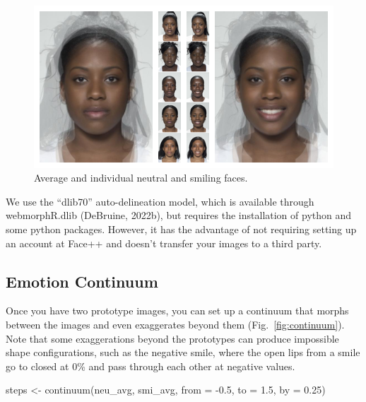 \documentclass[
  man,floatsintext]{apa6}
\newenvironment{Shaded}{\begin{snugshade}}{\end{snugshade}}
\newcommand{\AttributeTok}[1]{\textcolor[rgb]{0.77,0.63,0.00}{#1}}
\newcommand{\FloatTok}[1]{\textcolor[rgb]{0.00,0.00,0.81}{#1}}
\newcommand{\FunctionTok}[1]{\textcolor[rgb]{0.00,0.00,0.00}{#1}}
\newcommand{\NormalTok}[1]{#1}
\newcommand{\OtherTok}[1]{\textcolor[rgb]{0.56,0.35,0.01}{#1}}
\newcommand{\SpecialCharTok}[1]{\textcolor[rgb]{0.00,0.00,0.00}{#1}}
\begin{document}
\begin{figure}
\includegraphics[width=1\linewidth]{index_files/figure-latex/emo-avg-1} \caption{Average and individual neutral and smiling faces.}\label{fig:emo-avg}
\end{figure}

We use the ``dlib70'' auto-delineation model, which is available through webmorphR.dlib (DeBruine, 2022b), but requires the installation of python and some python packages. However, it has the advantage of not requiring setting up an account at Face++ and doesn't transfer your images to a third party.

\hypertarget{emotion-continuum}{%
\subsection{Emotion Continuum}\label{emotion-continuum}}

Once you have two prototype images, you can set up a continuum that morphs between the images and even exaggerates beyond them (Fig.~\ref{fig:continuum}). Note that some exaggerations beyond the prototypes can produce impossible shape configurations, such as the negative smile, where the open lips from a smile go to closed at 0\% and pass through each other at negative values.

\begin{Shaded}
\begin{Highlighting}[]
\NormalTok{steps }\OtherTok{\textless{}{-}} \FunctionTok{continuum}\NormalTok{(neu\_avg, smi\_avg, }\AttributeTok{from =} \SpecialCharTok{{-}}\FloatTok{0.5}\NormalTok{, }\AttributeTok{to =} \FloatTok{1.5}\NormalTok{, }\AttributeTok{by =} \FloatTok{0.25}\NormalTok{)}
\end{Highlighting}
\end{Shaded}
\end{document}
